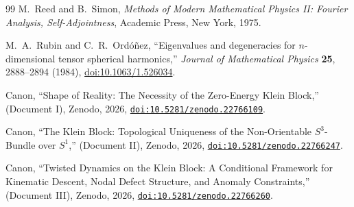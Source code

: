 \documentclass[11pt]{article}
\theoremstyle{canonmath}
\theoremstyle{canonpostulate}
\theoremstyle{canonproposition}
\theoremstyle{canonmath}
\theoremstyle{canonproposition}
\begin{document}
\begin{thebibliography}{99}
M.~Reed and B.~Simon, \textit{Methods of Modern Mathematical Physics II: Fourier Analysis, Self-Adjointness}, Academic Press, New York, 1975.

M.~A.~Rubin and C.~R.~Ordóñez, ``Eigenvalues and degeneracies for $n$-dimensional tensor spherical harmonics,'' \textit{Journal of Mathematical Physics} \textbf{25}, 2888--2894 (1984), \href{https://doi.org/10.1063/1.526034}{doi:10.1063/1.526034}.

Canon, ``Shape of Reality: The Necessity of the Zero-Energy Klein Block,'' (Document I), Zenodo, 2026, \href{https://doi.org/10.5281/zenodo.22766109}{\nolinkurl{doi:10.5281/zenodo.22766109}}.

Canon, ``The Klein Block: Topological Uniqueness of the Non-Orientable $S^3$-Bundle over $S^1$,'' (Document II), Zenodo, 2026, \href{https://doi.org/10.5281/zenodo.22766247}{\nolinkurl{doi:10.5281/zenodo.22766247}}.

Canon, ``Twisted Dynamics on the Klein Block: A Conditional Framework for Kinematic Descent, Nodal Defect Structure, and Anomaly Constraints,'' (Document III), Zenodo, 2026, \href{https://doi.org/10.5281/zenodo.22766260}{\nolinkurl{doi:10.5281/zenodo.22766260}}.

\end{thebibliography}
\end{document}
